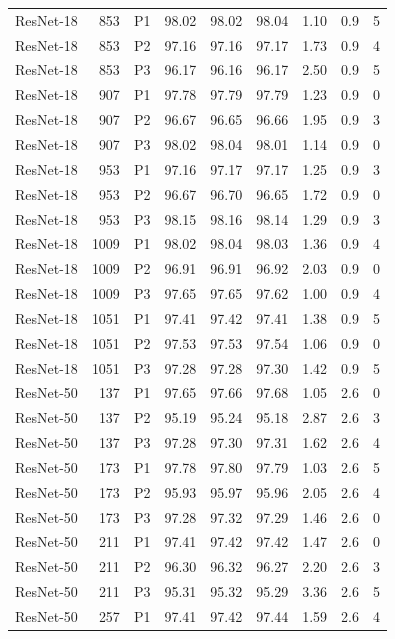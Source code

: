 {\begin{longtable}{lrlrrrrrr}
ResNet-18 & 853 & P1 & 98.02 & 98.02 & 98.04 & 1.10 & 0.9 & 5 \\
ResNet-18 & 853 & P2 & 97.16 & 97.16 & 97.17 & 1.73 & 0.9 & 4 \\
ResNet-18 & 853 & P3 & 96.17 & 96.16 & 96.17 & 2.50 & 0.9 & 5 \\
ResNet-18 & 907 & P1 & 97.78 & 97.79 & 97.79 & 1.23 & 0.9 & 0 \\
ResNet-18 & 907 & P2 & 96.67 & 96.65 & 96.66 & 1.95 & 0.9 & 3 \\
ResNet-18 & 907 & P3 & 98.02 & 98.04 & 98.01 & 1.14 & 0.9 & 0 \\
ResNet-18 & 953 & P1 & 97.16 & 97.17 & 97.17 & 1.25 & 0.9 & 3 \\
ResNet-18 & 953 & P2 & 96.67 & 96.70 & 96.65 & 1.72 & 0.9 & 0 \\
ResNet-18 & 953 & P3 & 98.15 & 98.16 & 98.14 & 1.29 & 0.9 & 3 \\
ResNet-18 & 1009 & P1 & 98.02 & 98.04 & 98.03 & 1.36 & 0.9 & 4 \\
ResNet-18 & 1009 & P2 & 96.91 & 96.91 & 96.92 & 2.03 & 0.9 & 0 \\
ResNet-18 & 1009 & P3 & 97.65 & 97.65 & 97.62 & 1.00 & 0.9 & 4 \\
ResNet-18 & 1051 & P1 & 97.41 & 97.42 & 97.41 & 1.38 & 0.9 & 5 \\
ResNet-18 & 1051 & P2 & 97.53 & 97.53 & 97.54 & 1.06 & 0.9 & 0 \\
ResNet-18 & 1051 & P3 & 97.28 & 97.28 & 97.30 & 1.42 & 0.9 & 5 \\
ResNet-50 & 137 & P1 & 97.65 & 97.66 & 97.68 & 1.05 & 2.6 & 0 \\
ResNet-50 & 137 & P2 & 95.19 & 95.24 & 95.18 & 2.87 & 2.6 & 3 \\
ResNet-50 & 137 & P3 & 97.28 & 97.30 & 97.31 & 1.62 & 2.6 & 4 \\
ResNet-50 & 173 & P1 & 97.78 & 97.80 & 97.79 & 1.03 & 2.6 & 5 \\
ResNet-50 & 173 & P2 & 95.93 & 95.97 & 95.96 & 2.05 & 2.6 & 4 \\
ResNet-50 & 173 & P3 & 97.28 & 97.32 & 97.29 & 1.46 & 2.6 & 0 \\
ResNet-50 & 211 & P1 & 97.41 & 97.42 & 97.42 & 1.47 & 2.6 & 0 \\
ResNet-50 & 211 & P2 & 96.30 & 96.32 & 96.27 & 2.20 & 2.6 & 3 \\
ResNet-50 & 211 & P3 & 95.31 & 95.32 & 95.29 & 3.36 & 2.6 & 5 \\
ResNet-50 & 257 & P1 & 97.41 & 97.42 & 97.44 & 1.59 & 2.6 & 4 \\

\end{longtable}}
